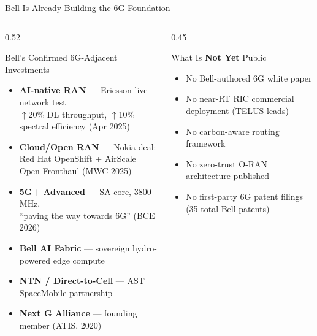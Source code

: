 \documentclass[aspectratio=169, 11pt]{beamer}
\begin{document}
\begin{frame}{Bell Is Already Building the 6G Foundation}

\begin{columns}[T]
\begin{column}{0.52\textwidth}

  \begin{block}{Bell's Confirmed 6G-Adjacent Investments}
    \vspace{2pt}
    \begin{itemize}\setlength{\itemsep}{3pt}
      \item \textbf{AI-native RAN} — Ericsson live-network test\\
            {\small $\uparrow$20\% DL throughput, $\uparrow$10\% spectral efficiency (Apr 2025)}
      \item \textbf{Cloud/Open RAN} — Nokia deal:\\
            {\small Red Hat OpenShift + AirScale Open Fronthaul (MWC 2025)}
      \item \textbf{5G+ Advanced} — SA core, 3800 MHz,\\
            {\small ``paving the way towards 6G'' (BCE 2026)}
      \item \textbf{Bell AI Fabric} — sovereign hydro-powered edge compute
      \item \textbf{NTN / Direct-to-Cell} — AST SpaceMobile partnership
      \item \textbf{Next G Alliance} — founding member (ATIS, 2020)
    \end{itemize}
    \vspace{2pt}
  \end{block}

\end{column}
\begin{column}{0.45\textwidth}

  \begin{alertblock}{What Is \textbf{Not Yet} Public}
    \vspace{2pt}
    \begin{itemize}\setlength{\itemsep}{2pt}
      \item {\small No Bell-authored 6G white paper}
      \item {\small No near-RT RIC commercial deployment (TELUS leads)}
      \item {\small No carbon-aware routing framework}
      \item {\small No zero-trust O-RAN architecture published}
      \item {\small No first-party 6G patent filings (35 total Bell patents)}
    \end{itemize}
    \vspace{2pt}
  \end{alertblock}


\end{column}
\end{columns}
\end{frame}
\end{document}

